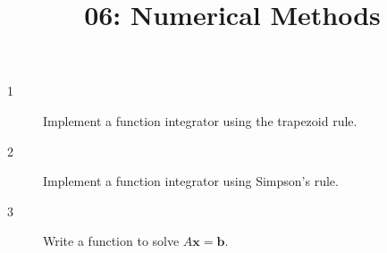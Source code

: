 \documentclass[10pt]{amsart}
\title{06: Numerical Methods}
\begin{document}
\maketitle

\begin{description}
\item[1] Implement a function integrator using the trapezoid rule.
\vspace{0.75in}

\item[2] Implement a function integrator using Simpson's rule.
\vspace{0.75in}

\item[3] Write a function to solve $A\mathbf{x} = \mathbf{b}$.
\vspace{0.75in}
\end{description}
\end{document}
